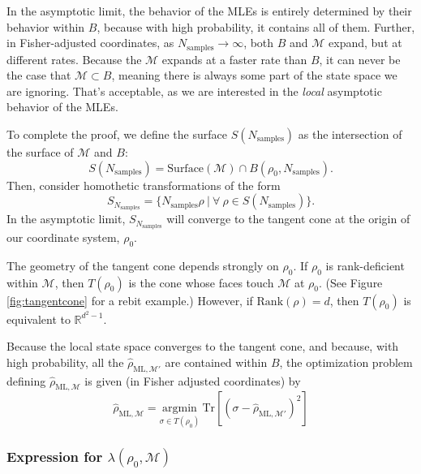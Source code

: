 \documentclass[aps,pra, twocolumn]{revtex4-1}
\newcommand{\M}{\mathcal{M}}
\newcommand{\rhohat}{\hat{\rho}}
\newcommand{\rhoML}[1]{\rhohat_{\scriptscriptstyle{\mathrm{ML},#1}}}
\begin{document}
In the asymptotic limit, the behavior of the MLEs is entirely determined by their behavior within $B$, because with high probability, it contains all of them. Further, in Fisher-adjusted coordinates, as $N_{\mathrm{samples}}\rightarrow \infty$, both $B$ and $\M$ expand, but at different rates. Because the $\M$ expands at a faster rate than $B$, it can never be the case that $\M \subset B$, meaning there is always some part of the state space we are ignoring. That's acceptable, as we are interested in the \emph{local} asymptotic behavior of the MLEs.

To complete the proof, we define the surface $S(N_{\mathrm{samples}})$ as the intersection of the surface of $\M$ and $B$:
\[S(N_{\mathrm{samples}}) = \text{Surface}(\M) \cap B(\rho_{0}, N_{\mathrm{samples}}).\]
Then, consider homothetic transformations of the form
\[S_{N_{\mathrm{samples}}} = \{N_{\mathrm{samples}}\rho~|~\forall~\rho \in S(N_{\mathrm{samples}})\}.\]
In the asymptotic limit, $S_{N_{\mathrm{samples}}}$ will converge to the tangent cone at the origin of our coordinate system, $\rho_{0}$.

The geometry of the tangent cone depends strongly on $\rho_{0}$. If $\rho_{0}$ is rank-deficient within $\M$, then $T(\rho_{0})$ is the cone whose faces touch $\M$ at $\rho_{0}$. (See Figure \ref{fig:tangentcone} for a rebit example.) However, if $\mathrm{Rank}(\rho)  = d$, then $T(\rho_{0})$ is equivalent to $\mathbb{R}^{d^{2}-1}$.

Because the local state space converges to the tangent cone, and because, with high probability, all the $\rhoML{\M'}$ are contained within $B$, the optimization problem defining $\rhoML{\M}$ is given (in Fisher adjusted coordinates) by
\begin{equation}
\label{eq:lampnmle2}
\rhoML{\M} = \underset{\sigma \in T(\rho_{0})}{\text{argmin}}~\mathrm{Tr}[(\sigma  -\rhoML{\M'})^{2}]
\end{equation}

\subsubsection{Expression for $\lambda(\rho_{0}, \M)$}
\end{document}
